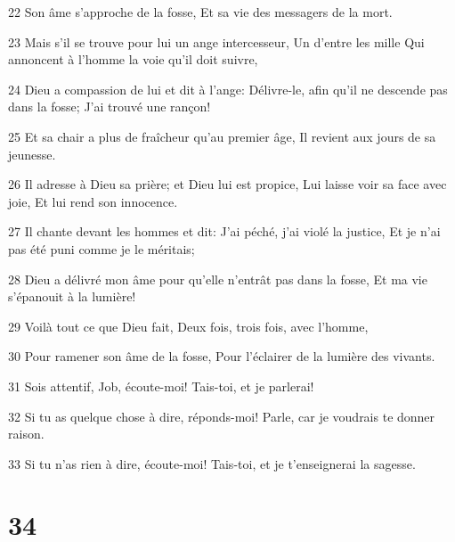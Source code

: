 \par 22 Son âme s'approche de la fosse, Et sa vie des messagers de la mort.
\par 23 Mais s'il se trouve pour lui un ange intercesseur, Un d'entre les mille Qui annoncent à l'homme la voie qu'il doit suivre,
\par 24 Dieu a compassion de lui et dit à l'ange: Délivre-le, afin qu'il ne descende pas dans la fosse; J'ai trouvé une rançon!
\par 25 Et sa chair a plus de fraîcheur qu'au premier âge, Il revient aux jours de sa jeunesse.
\par 26 Il adresse à Dieu sa prière; et Dieu lui est propice, Lui laisse voir sa face avec joie, Et lui rend son innocence.
\par 27 Il chante devant les hommes et dit: J'ai péché, j'ai violé la justice, Et je n'ai pas été puni comme je le méritais;
\par 28 Dieu a délivré mon âme pour qu'elle n'entrât pas dans la fosse, Et ma vie s'épanouit à la lumière!
\par 29 Voilà tout ce que Dieu fait, Deux fois, trois fois, avec l'homme,
\par 30 Pour ramener son âme de la fosse, Pour l'éclairer de la lumière des vivants.
\par 31 Sois attentif, Job, écoute-moi! Tais-toi, et je parlerai!
\par 32 Si tu as quelque chose à dire, réponds-moi! Parle, car je voudrais te donner raison.
\par 33 Si tu n'as rien à dire, écoute-moi! Tais-toi, et je t'enseignerai la sagesse.

\chapter{34}

